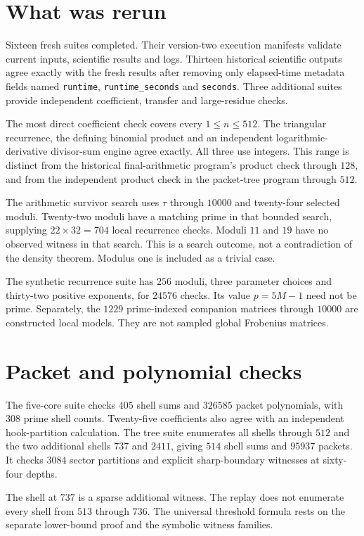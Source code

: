 \section{What was rerun}
Sixteen fresh suites completed. Their version-two execution manifests validate current inputs, scientific results and logs. Thirteen historical scientific outputs agree exactly with the fresh results after removing only elapsed-time metadata fields named \texttt{runtime}, \texttt{runtime\_seconds} and \texttt{seconds}. Three additional suites provide independent coefficient, transfer and large-residue checks.

The most direct coefficient check covers every $1\le n\le512$. The triangular recurrence, the defining binomial product and an independent logarithmic-derivative divisor-sum engine agree exactly. All three use integers. This range is distinct from the historical final-arithmetic program's product check through $128$, and from the independent product check in the packet-tree program through $512$.

The arithmetic survivor search uses $\tau$ through $10000$ and twenty-four selected moduli. Twenty-two moduli have a matching prime in that bounded search, supplying $22\times32=704$ local recurrence checks. Moduli $11$ and $19$ have no observed witness in that search. This is a search outcome, not a contradiction of the density theorem. Modulus one is included as a trivial case.

The synthetic recurrence suite has $256$ moduli, three parameter choices and thirty-two positive exponents, for $24576$ checks. Its value $p=5M-1$ need not be prime. Separately, the $1229$ prime-indexed companion matrices through $10000$ are constructed local models. They are not sampled global Frobenius matrices.

\section{Packet and polynomial checks}
The five-core suite checks $405$ shell sums and $326585$ packet polynomials, with $308$ prime shell counts. Twenty-five coefficients also agree with an independent hook-partition calculation. The tree suite enumerates all shells through $512$ and the two additional shells $737$ and $2411$, giving $514$ shell sums and $95937$ packets. It checks $3084$ sector partitions and explicit sharp-boundary witnesses at sixty-four depths.

The shell at $737$ is a sparse additional witness. The replay does not enumerate every shell from $513$ through $736$. The universal threshold formula rests on the separate lower-bound proof and the symbolic witness families.

